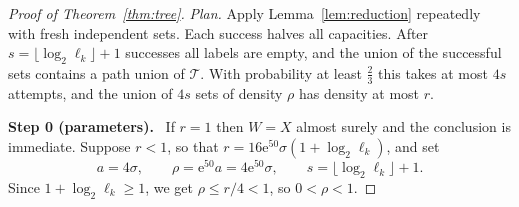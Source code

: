 \documentclass[11pt]{article}
\numberwithin{equation}{section}
\newcommand{\TT}{\mathcal T}
\newcommand{\ee}{\mathrm e}
\newcommand{\step}[2]{\par\medskip\noindent\textbf{Step #1 (#2).}\ }
\begin{document}
\begin{proof}[Proof of Theorem~\ref{thm:tree}]
\emph{Plan.} Apply Lemma~\ref{lem:reduction} repeatedly with fresh
independent sets. Each success halves all capacities. After
$s=\lfloor\log_2\ell_k\rfloor+1$ successes all labels are empty, and
the union of the successful sets contains a path union of $\TT$. With
probability at least $\frac23$ this takes at most $4s$ attempts, and
the union of $4s$ sets of density $\rho$ has density at most $r$.

\step{0}{parameters}
If $r=1$ then $W=X$ almost surely and the conclusion is immediate.
Suppose $r<1$, so that $r=16\ee^{50}\sigma(1+\log_2\ell_k)$, and set
\[
 a=4\sigma,\qquad \rho=\ee^{50}a=4\ee^{50}\sigma,
 \qquad s=\lfloor\log_2\ell_k\rfloor+1.
\]
Since $1+\log_2\ell_k\ge1$, we get
$\rho\le r/4<1$, so $0<\rho<1$.


\end{proof}
\end{document}
